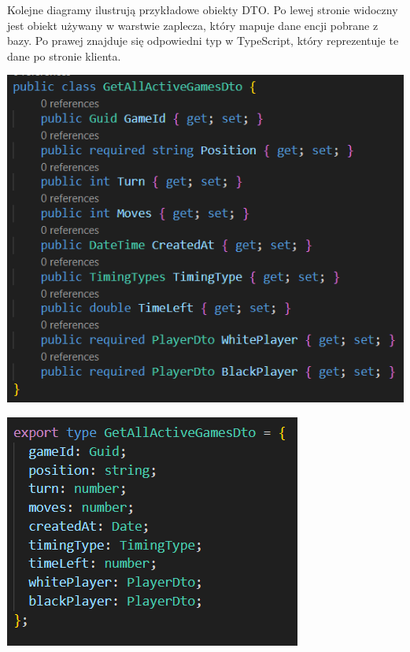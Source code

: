\documentclass[twoside]{projektInzynierskiMS1}
\begin{document}
\noindent
Kolejne diagramy ilustrują przykładowe obiekty DTO. Po lewej stronie widoczny jest obiekt używany w warstwie zaplecza, który mapuje dane encji pobrane z bazy. Po prawej znajduje się odpowiedni typ w TypeScript, który reprezentuje te dane po stronie klienta.

\vspace{0.5cm}
\begin{minipage}[t]{0.45\textwidth} 
    \vspace{0pt} 
    \centering 
    \includegraphics[width=\linewidth]{images/ex_dto_back.png} 
\end{minipage} 
\hfill 
\begin{minipage}[t]{0.45\textwidth} 
    \vspace{0pt} 
    \centering 
    \includegraphics[width=\linewidth]{images/ex_dto_front.png} 
\end{minipage}
\end{document}
